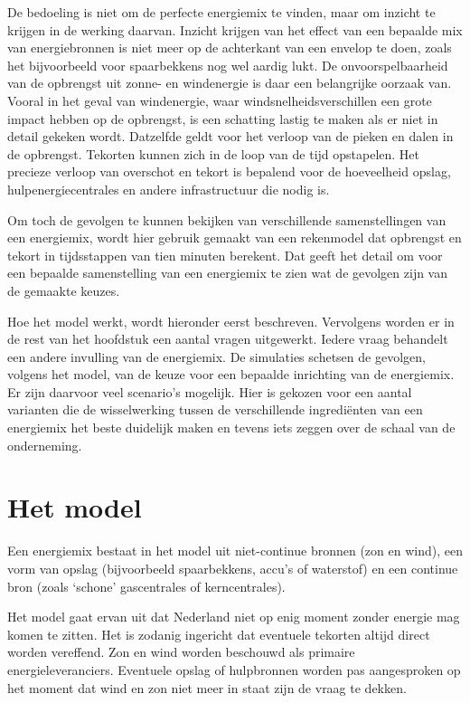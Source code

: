 \documentclass[
  11pt,
  a4paper,
]{book}
\begin{document}
De bedoeling is niet om de perfecte energiemix te vinden, maar om inzicht te krijgen in de werking daarvan. Inzicht krijgen van het effect van een bepaalde mix van energiebronnen is niet meer op de achterkant van een envelop te doen, zoals het bijvoorbeeld voor spaarbekkens nog wel aardig lukt. De onvoorspelbaarheid van de opbrengst uit zonne- en windenergie is daar een belangrijke oorzaak van. Vooral in het geval van windenergie, waar windsnelheidsverschillen een grote impact hebben op de opbrengst, is een schatting lastig te maken als er niet in detail gekeken wordt. Datzelfde geldt voor het verloop van de pieken en dalen in de opbrengst. Tekorten kunnen zich in de loop van de tijd opstapelen. Het precieze verloop van overschot en tekort is bepalend voor de hoeveelheid opslag, hulpenergiecentrales en andere infrastructuur die nodig is.

Om toch de gevolgen te kunnen bekijken van verschillende samenstellingen van een energiemix, wordt hier gebruik gemaakt van een rekenmodel dat opbrengst en tekort in tijdsstappen van tien minuten berekent. Dat geeft het detail om voor een bepaalde samenstelling van een energiemix te zien wat de gevolgen zijn van de gemaakte keuzes.

Hoe het model werkt, wordt hieronder eerst beschreven. Vervolgens worden er in de rest van het hoofdstuk een aantal vragen uitgewerkt. Iedere vraag behandelt een andere invulling van de energiemix. De simulaties schetsen de gevolgen, volgens het model, van de keuze voor een bepaalde inrichting van de energiemix. Er zijn daarvoor veel scenario's mogelijk. Hier is gekozen voor een aantal varianten die de wisselwerking tussen de verschillende ingrediënten van een energiemix het beste duidelijk maken en tevens iets zeggen over de schaal van de onderneming.

\hypertarget{het-model}{%
\section{Het model}\label{het-model}}

Een energiemix bestaat in het model uit niet-continue bronnen (zon en wind), een vorm van opslag (bijvoorbeeld spaarbekkens, accu's of waterstof) en een continue bron (zoals `schone' gascentrales of kerncentrales).

Het model gaat ervan uit dat Nederland niet op enig moment zonder energie mag komen te zitten. Het is zodanig ingericht dat eventuele tekorten altijd direct worden vereffend. Zon en wind worden beschouwd als primaire energieleveranciers. Eventuele opslag of hulpbronnen worden pas aangesproken op het moment dat wind en zon niet meer in staat zijn de vraag te dekken.
\end{document}
